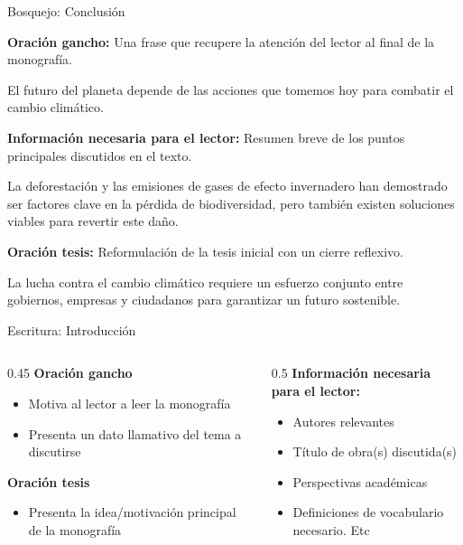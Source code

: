 \documentclass[
11pt, %
]{beamer}
\begin{document}
\begin{frame}{Bosquejo: Conclusión}

	\textbf{Oración gancho:} Una frase que recupere la atención del lector al final de la monografía.
	\begin{block}{}
		El futuro del planeta depende de las acciones que tomemos hoy para combatir el cambio climático.
	\end{block}

	\textbf{Información necesaria para el lector:} Resumen breve de los puntos principales discutidos en el texto.
	\begin{block}{}
		La deforestación y las emisiones de gases de efecto invernadero han demostrado ser factores clave en la pérdida de biodiversidad, pero también existen soluciones viables para revertir este daño.
	\end{block}

	\textbf{Oración tesis:} Reformulación de la tesis inicial con un cierre reflexivo.
	\begin{block}{}
		La lucha contra el cambio climático requiere un esfuerzo conjunto entre gobiernos, empresas y ciudadanos para garantizar un futuro sostenible.
	\end{block}
\end{frame}

\begin{frame}{Escritura: Introducción}

	\begin{columns}[c]
		\begin{column}{0.45\textwidth}
			\textbf{Oración gancho}
			\begin{itemize}
				\item Motiva al lector a leer la monografía
				\item Presenta un dato llamativo del tema a discutirse
			\end{itemize}
			\textbf{Oración tesis}
			\begin{itemize}
				\item Presenta la idea/motivación principal de la monografía
			\end{itemize}
		\end{column}
		\begin{column}{0.5\textwidth}
			\textbf{Información necesaria para el lector:}
			\begin{itemize}
				\item Autores relevantes
				\item Título de obra(s) discutida(s)
				\item Perspectivas académicas
				\item Definiciones de vocabulario necesario. Etc
			\end{itemize}
		\end{column}
	\end{columns}
\end{frame}
\end{document}
